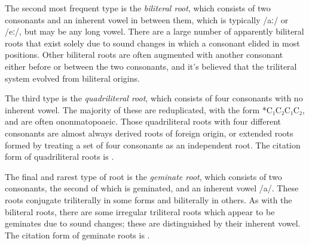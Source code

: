 \documentclass[grammar]{subfiles}
\begin{document}
The second most frequent type is the \emph{biliteral root}, which consists of two
consonants and an inherent vowel in between them, which is typically /aː/ or
/eː/, but may be any long vowel. There are a large number of apparently
biliteral roots that exist solely due to sound changes in which a consonant
elided in most positions.  Other biliteral roots are often augmented with
another consonant either before or between the two consonants, and it's
believed that the triliteral system evolved from biliteral origins. 

The third type is the \emph{quadriliteral root}, which consists of four consonants
with no inherent vowel.  The majority of these are reduplicated, with the form
*C₁C₂C₁C₂, and are often ononmatopoaeic.  Those quadriliteral roots with four
different consonants are almost always derived roots of foreign origin, or
extended roots formed by treating a set of four consonants as an independent
root.  The citation form of quadriliteral roots is .

The final and rarest type of root is the \emph{geminate root}, which consists of two
consonants, the second of which is geminated, and an inherent vowel /a/. These
roots conjugate triliterally in some forms and biliterally in others.
As with the biliteral roots, there are some irregular triliteral roots
which appear to be geminates due to sound changes; these are distinguished by
their inherent vowel.  The citation form of geminate roots is .


% 
% 
\end{document}
